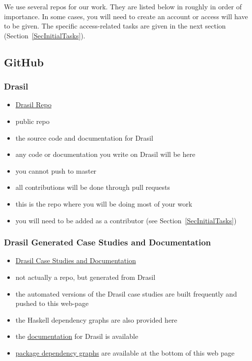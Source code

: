 \documentclass[12pt]{article}
\begin{document}
We use several repos for our work.  They are listed below in roughly in order of
importance.  In some cases, you will need to create an account or access will
have to be given.  The specific access-related tasks are given in the next
section (Section~\ref{SecInitialTasks}).

\subsection{GitHub}

\subsubsection{Drasil}
\begin{itemize}
\item \href{https://github.com/JacquesCarette/Drasil} {Drasil Repo}
\item public repo
\item the source code and documentation for Drasil
\item any code or documentation you write on Drasil will be here
\item you cannot push to master
\item all contributions will be done through pull requests
\item this is the repo where you will be doing most of your work
\item you will need to be added as a contributor (see Section~\ref{SecInitialTasks})
\end{itemize}

\subsubsection{Drasil Generated Case Studies and Documentation}
\begin{itemize}
\item \href{https://jacquescarette.github.io/Drasil/} {Drasil Case Studies and Documentation}
\item not actually a repo, but generated from Drasil
\item the automated versions of the Drasil case studies are built frequently and
pushed to this web-page
\item the Haskell dependency graphs are also provided here
\item the \href{https://jacquescarette.github.io/Drasil/docs/index.html}
{documentation} for Drasil is available
\item \href{https://jacquescarette.github.io/Drasil/} {package dependency
graphs} are available at the bottom of this web page
\end{itemize}
\end{document}
